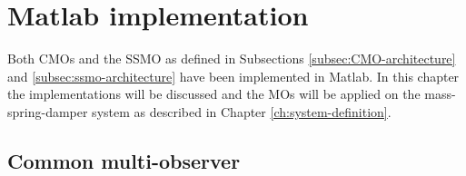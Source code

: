 \section{Matlab implementation}
Both CMOs and the SSMO as defined in Subsections \ref{subsec:CMO-architecture} and \ref{subsec:ssmo-architecture} have been implemented in Matlab. In this chapter the implementations will be discussed and the MOs will be applied on the mass-spring-damper system as described in Chapter \ref{ch:system-definition}.

\subsection{Common multi-observer}

\subsection{}